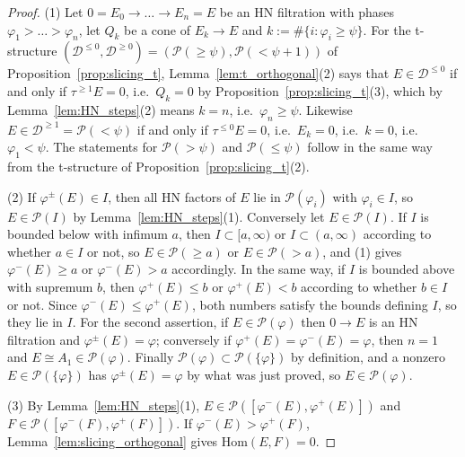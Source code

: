 \documentclass[12pt]{amsart}
\numberwithin{theorem}{section}
\theoremstyle{definition}
\newcommand{\calP}{\mathcal{P}}
\newcommand{\Hom}{\mathrm{Hom}}
\newcommand{\calD}{\mathcal{D}}
\newcommand{\Dle}[1]{\calD^{\leqslant #1}}
\newcommand{\Dge}[1]{\calD^{\geqslant #1}}
\begin{document}
	\begin{proof}
		(1) Let $0 = E_0 \to \ldots \to E_n = E$ be an HN filtration with phases $\varphi_1 > \ldots > \varphi_n$, let $Q_k$ be a cone of $E_k \to E$ and $k := \# \{ i : \varphi_i \geqslant \psi \}$.
		For the t-structure $(\Dle{0}, \Dge{0}) = (\calP(\geqslant \psi), \calP(< \psi + 1))$ of Proposition~\ref{prop:slicing_t}, Lemma~\ref{lem:t_orthogonal}(2) says that $E \in \Dle{0}$ if and only if $\tau^{\geqslant 1} E = 0$, i.e.\ $Q_k = 0$ by Proposition~\ref{prop:slicing_t}(3), which by Lemma~\ref{lem:HN_steps}(2) means $k = n$, i.e.\ $\varphi_n \geqslant \psi$.
		Likewise $E \in \Dge{1} = \calP(< \psi)$ if and only if $\tau^{\leqslant 0} E = 0$, i.e.\ $E_k = 0$, i.e.\ $k = 0$, i.e.\ $\varphi_1 < \psi$.
		The statements for $\calP(> \psi)$ and $\calP(\leqslant \psi)$ follow in the same way from the t-structure of Proposition~\ref{prop:slicing_t}(2).

		(2) If $\varphi^{\pm}(E) \in I$, then all HN factors of $E$ lie in $\calP(\varphi_i)$ with $\varphi_i \in I$, so $E \in \calP(I)$ by Lemma~\ref{lem:HN_steps}(1).
		Conversely let $E \in \calP(I)$.
		If $I$ is bounded below with infimum $a$, then $I \subset [a, \infty)$ or $I \subset (a, \infty)$ according to whether $a \in I$ or not, so $E \in \calP(\geqslant a)$ or $E \in \calP(> a)$, and (1) gives $\varphi^-(E) \geqslant a$ or $\varphi^-(E) > a$ accordingly.
		In the same way, if $I$ is bounded above with supremum $b$, then $\varphi^+(E) \leqslant b$ or $\varphi^+(E) < b$ according to whether $b \in I$ or not.
		Since $\varphi^-(E) \leqslant \varphi^+(E)$, both numbers satisfy the bounds defining $I$, so they lie in $I$.
		For the second assertion, if $E \in \calP(\varphi)$ then $0 \to E$ is an HN filtration and $\varphi^{\pm}(E) = \varphi$;
		conversely if $\varphi^+(E) = \varphi^-(E) = \varphi$, then $n = 1$ and $E \cong A_1 \in \calP(\varphi)$.
		Finally $\calP(\varphi) \subset \calP(\{ \varphi \})$ by definition, and a nonzero $E \in \calP(\{ \varphi \})$ has $\varphi^{\pm}(E) = \varphi$ by what was just proved, so $E \in \calP(\varphi)$.

		(3) By Lemma~\ref{lem:HN_steps}(1), $E \in \calP([\varphi^-(E), \varphi^+(E)])$ and $F \in \calP([\varphi^-(F), \varphi^+(F)])$.
		If $\varphi^-(E) > \varphi^+(F)$, Lemma~\ref{lem:slicing_orthogonal} gives $\Hom(E, F) = 0$.


\end{proof}
\end{document}
